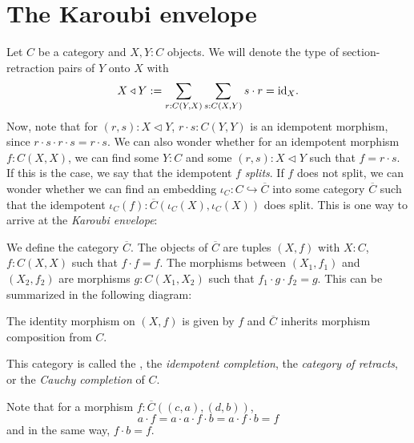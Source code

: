 \section{The Karoubi envelope}
Let $ C $ be a category and $ X, Y : C $ objects. We will denote the type of section-retraction pairs of $ Y $ onto $ X $ with
\[ X \triangleleft Y := \sum_{r : C(Y, X)} \sum_{s : C(X, Y)} s \cdot r = \text{id}_{X}. \]
Now, note that for $ (r, s) : X \triangleleft Y $, $ r \cdot s: C(Y, Y) $ is an idempotent morphism, since $ r \cdot s \cdot r \cdot s = r \cdot s $. We can also wonder whether for an idempotent morphism $ f: C(X, X) $, we can find some $ Y : C $ and some $ (r, s) : X \triangleleft Y $ such that $ f = r \cdot s $. If this is the case, we say that the idempotent $ f $ \textit{splits}. If $ f $ does not split, we can wonder whether we can find an embedding $ \iota_C : C \hookrightarrow \overline C $ into some category $ \overline C $ such that the idempotent $ \iota_C(f): \overline C(\iota_C(X), \iota_C(X)) $ does split. This is one way to arrive at the \textit{Karoubi envelope}:

\begin{definition}
  We define the category $ \overline C $. The objects of $ \overline C $ are tuples $ (X, f) $ with $ X: C $, $ f: C(X, X) $ such that $ f \cdot f = f $. The morphisms between $ (X_1, f_1) $ and $ (X_2, f_2) $ are morphisms $ g: C(X_1, X_2) $ such that $ f_1 \cdot g \cdot f_2 = g $. This can be summarized in the following diagram:
  \begin{center}
  \end{center}
  The identity morphism on $ (X, f) $ is given by $ f $ and $ \overline C $ inherits morphism composition from $ C $.
\end{definition}
This category is called the , the \textit{idempotent completion}, the \textit{category of retracts}, or the \textit{Cauchy completion} of $ C $.

\begin{remark}
  Note that for a morphism $ f: \overline C((c, a), (d, b)) $,
  \[ a \cdot f = a \cdot a \cdot f \cdot b = a \cdot f \cdot b = f \]
  and in the same way, $ f \cdot b = f $.
\end{remark}

